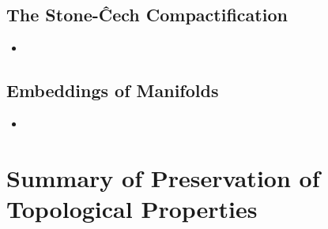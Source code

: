 \documentclass[11pt]{article}
\begin{document}
\subsection{The Stone-{\^C}ech Compactification}
\begin{itemize}
\item 
\end{itemize}

\subsection{Embeddings of Manifolds}
\begin{itemize}
\item 
\end{itemize}


\newpage
\section{Summary of Preservation of Topological Properties}
\end{document}
